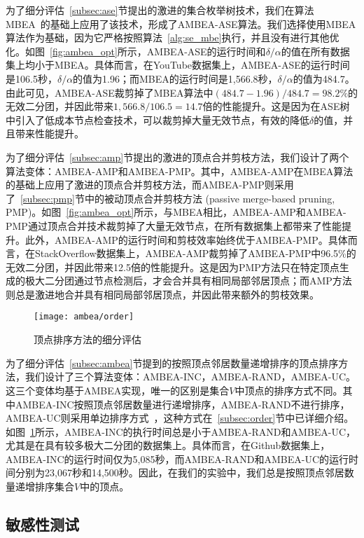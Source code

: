 为了细分评估~\ref{subsec:ase}节提出的激进的集合枚举树技术，我们在算法MBEA~\cite{iMBEA14}的基础上应用了该技术，形成了AMBEA-ASE算法。我们选择使用MBEA算法作为基础，因为它严格按照算法~\ref{alg:se_mbe}执行，并且没有进行其他优化。如图~\ref{fig:ambea_opt}所示，AMBEA-ASE的运行时间和$\delta/\alpha$的值在所有数据集上均小于MBEA。具体而言，在YouTube数据集上，AMBEA-ASE的运行时间是106.5秒，$\delta/\alpha$的值为1.96；而MBEA的运行时间是1,566.8秒，$\delta/\alpha$的值为484.7。由此可见，AMBEA-ASE裁剪掉了MBEA算法中$(484.7-1.96)/484.7=98.2\%$的无效二分团，并因此带来$1,566.8/106.5=14.7$倍的性能提升。这是因为在ASE树中引入了低成本节点检查技术，可以裁剪掉大量无效节点，有效的降低$\delta$的值，并且带来性能提升。

为了细分评估~\ref{subsec:amp}节提出的激进的顶点合并剪枝方法，我们设计了两个算法变体：AMBEA-AMP和AMBEA-PMP。其中，AMBEA-AMP在MBEA算法的基础上应用了激进的顶点合并剪枝方法，而AMBEA-PMP则采用了~\ref{subsec:pmp}节中的被动顶点合并剪枝方法 (passive merge-based pruning, PMP)。如图~\ref{fig:ambea_opt}所示，与MBEA相比，AMBEA-AMP和AMBEA-PMP通过顶点合并技术裁剪掉了大量无效节点，在所有数据集上都带来了性能提升。此外，AMBEA-AMP的运行时间和剪枝效率始终优于AMBEA-PMP。具体而言，在StackOverflow数据集上，AMBEA-AMP裁剪掉了AMBEA-PMP中96.5\%的无效二分团，并因此带来12.5倍的性能提升。这是因为PMP方法只在特定顶点生成的极大二分团通过节点检测后，才会合并具有相同局部邻居顶点；而AMP方法则总是激进地合并具有相同局部邻居顶点，并因此带来额外的剪枝效果。

\begin{figure} [H]
	\centering

		\texttt{[image: ambea/order]}

	\caption{顶点排序方法的细分评估}
	\label{fig:ambea_opt_order}
\end{figure}

为了细分评估~\ref{subsec:ambea}节提到的按照顶点邻居数量递增排序的顶点排序方法，我们设计了三个算法变体：AMBEA-INC，AMBEA-RAND，AMBEA-UC。这三个变体均基于AMBEA实现，唯一的区别是集合$V$中顶点的排序方式不同。其中AMBEA-INC按照顶点邻居数量进行递增排序，AMBEA-RAND不进行排序，AMBEA-UC则采用单边排序方式~\cite{ooMBE22}，这种方式在~\ref{subsec:order}节中已详细介绍。如图~\ref{fig:ambea_opt_order}所示，AMBEA-INC的执行时间总是小于AMBEA-RAND和AMBEA-UC，尤其是在具有较多极大二分团的数据集上。具体而言，在Github数据集上，AMBEA-INC的运行时间仅为5,085秒，而AMBEA-RAND和AMBEA-UC的运行时间分别为23,067秒和14,500秒。因此，在我们的实验中，我们总是按照顶点邻居数量递增排序集合$V$中的顶点。

\subsection{敏感性测试}

